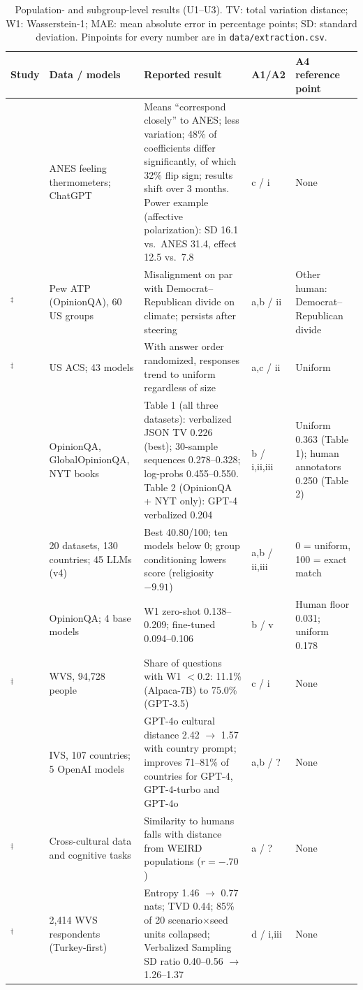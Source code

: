 \documentclass[11pt]{article}
\newcommand{\sa}{$^\dagger$}
\newcommand{\ab}{$^\ddagger$}
\begin{document}
\begin{table}[p]
\centering
\scriptsize
\caption{Population- and subgroup-level results (U1--U3). TV: total variation distance; W1: Wasserstein-1; MAE: mean absolute error in percentage points; SD: standard deviation. Pinpoints for every number are in \nolinkurl{data/extraction.csv}.}
\label{tab:dist}
\begin{tabular}{@{}L{1.9cm}L{2.7cm}L{5.4cm}L{0.9cm}L{3.3cm}@{}}
\toprule
Study & Data / models & Reported result & A1/A2 & A4 reference point \\
\midrule
\citet{bisbee2024} & ANES feeling thermometers; ChatGPT & Means ``correspond closely'' to ANES; less variation; 48\% of coefficients differ significantly, of which 32\% flip sign; results shift over 3 months. Power example (affective polarization): SD 16.1 vs.\ ANES 31.4, effect 12.5 vs.\ 7.8 & c / i & None \\
\citet{santurkar2023}\ab & Pew ATP (OpinionQA), 60 US groups & Misalignment on par with Democrat--Republican divide on climate; persists after steering & a,b / ii & Other human: Democrat--Republican divide \\
\citet{dominguez2024}\ab & US ACS; 43 models & With answer order randomized, responses trend to uniform regardless of size & a,c / ii & Uniform \\
\citet{meister2024} & OpinionQA, GlobalOpinionQA, NYT books & Table 1 (all three datasets): verbalized JSON TV 0.226 (best); 30-sample sequences 0.278--0.328; log-probs 0.455--0.550. Table 2 (OpinionQA + NYT only): GPT-4 verbalized 0.204 & b / i,ii,iii & Uniform 0.363 (Table 1); human annotators 0.250 (Table 2) \\
\citet{hu2025simbench} & 20 datasets, 130 countries; 45 LLMs (v4) & Best 40.80/100; ten models below 0; group conditioning lowers score (religiosity $-9.91$) & a,b / ii,iii & 0 = uniform, 100 = exact match \\
\citet{suh2025subpop} & OpinionQA; 4 base models & W1 zero-shot 0.138--0.209; fine-tuned 0.094--0.106 & b / v & Human floor 0.031; uniform 0.178 \\
\citet{zhao2024wvb}\ab & WVS, 94,728 people & Share of questions with W1 $<0.2$: 11.1\% (Alpaca-7B) to 75.0\% (GPT-3.5) & c / i & None \\
\citet{tao2024} & IVS, 107 countries; 5 OpenAI models & GPT-4o cultural distance 2.42 $\to$ 1.57 with country prompt; improves 71--81\% of countries for GPT-4, GPT-4-turbo and GPT-4o & a,b / ? & None \\
\citet{atari2023}\ab & Cross-cultural data and cognitive tasks & Similarity to humans falls with distance from WEIRD populations ($r=-.70$) & a / ? & None \\
\citet{ozkan2026}\sa & 2,414 WVS respondents (Turkey-first) & Entropy 1.46 $\to$ 0.77 nats; TVD 0.44; 85\% of 20 scenario$\times$seed units collapsed; Verbalized Sampling SD ratio 0.40--0.56 $\to$ 1.26--1.37 & d / i,iii & None \\
\bottomrule
\end{tabular}
\end{table}
\end{document}
